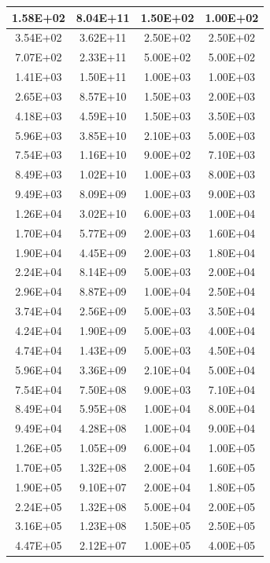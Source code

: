 \documentclass{hitec}
\begin{document}
\begin{table}[!h]
\begin{tabular}{|c | c | c | c |}
1.58E+02&8.04E+11&1.50E+02&1.00E+02\\\hline
3.54E+02&3.62E+11&2.50E+02&2.50E+02\\\hline
7.07E+02&2.33E+11&5.00E+02&5.00E+02\\\hline
1.41E+03&1.50E+11&1.00E+03&1.00E+03\\\hline
2.65E+03&8.57E+10&1.50E+03&2.00E+03\\\hline
4.18E+03&4.59E+10&1.50E+03&3.50E+03\\\hline
5.96E+03&3.85E+10&2.10E+03&5.00E+03\\\hline
7.54E+03&1.16E+10&9.00E+02&7.10E+03\\\hline
8.49E+03&1.02E+10&1.00E+03&8.00E+03\\\hline
9.49E+03&8.09E+09&1.00E+03&9.00E+03\\\hline
1.26E+04&3.02E+10&6.00E+03&1.00E+04\\\hline
1.70E+04&5.77E+09&2.00E+03&1.60E+04\\\hline
1.90E+04&4.45E+09&2.00E+03&1.80E+04\\\hline
2.24E+04&8.14E+09&5.00E+03&2.00E+04\\\hline
2.96E+04&8.87E+09&1.00E+04&2.50E+04\\\hline
3.74E+04&2.56E+09&5.00E+03&3.50E+04\\\hline
4.24E+04&1.90E+09&5.00E+03&4.00E+04\\\hline
4.74E+04&1.43E+09&5.00E+03&4.50E+04\\\hline
5.96E+04&3.36E+09&2.10E+04&5.00E+04\\\hline
7.54E+04&7.50E+08&9.00E+03&7.10E+04\\\hline
8.49E+04&5.95E+08&1.00E+04&8.00E+04\\\hline
9.49E+04&4.28E+08&1.00E+04&9.00E+04\\\hline
1.26E+05&1.05E+09&6.00E+04&1.00E+05\\\hline
1.70E+05&1.32E+08&2.00E+04&1.60E+05\\\hline
1.90E+05&9.10E+07&2.00E+04&1.80E+05\\\hline
2.24E+05&1.32E+08&5.00E+04&2.00E+05\\\hline
3.16E+05&1.23E+08&1.50E+05&2.50E+05\\\hline
4.47E+05&2.12E+07&1.00E+05&4.00E+05\\\hline
	\end{tabular}
\end{table}
\clearpage %

\end{document}
